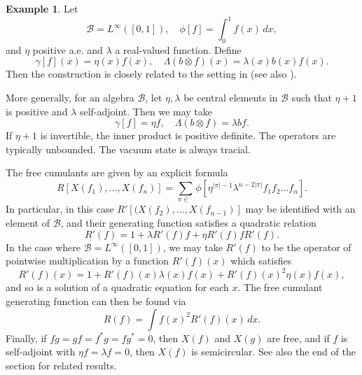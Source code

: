 \documentclass[12pt]{amsart}
\theoremstyle{definition}
\newtheorem{Example}[Thm]{Example}
\newcommand{\abs}[1]{\left\vert#1\right\vert}
\newcommand{\mc}[1]{\mathcal{#1}}
\DeclareMathOperator{\cNC}{\widetilde{\mathrm{NC}}}
\begin{document}
\begin{Example}
\label{Example:Bozejko}
Let
\[
\mc{B} = L^\infty([0,1]), \quad \phi[f] = \int_0^1 f(x) \,dx,
\]
and $\eta$ positive a.e. and $\lambda$ a real-valued function. Define
\[
\gamma[f](x) = \eta(x) f(x), \quad \Lambda(b \otimes f)(x) = \lambda(x) b(x) f(x).
\]
Then the construction is closely related to the setting in \cite{Bozejko-Lytvynov-Meixner-I,Bozejko-Lytvynov-Meixner-II} (see also \cite{Bozejko-Lytvynov-Rodionova-Anyon}).

More generally, for an algebra $\mc{B}$, let $\eta, \lambda$ be central elements in $\mc{B}$ such that $\eta + 1$ is positive and $\lambda$ self-adjoint. Then we may take
\[
\gamma[f] = \eta f, \quad \Lambda(b \otimes f) = \lambda b f.
\]
If $\eta + 1$ is invertible, the inner product is positive definite. The operators are typically unbounded. The vacuum state is always tracial.

The free cumulants are given by an explicit formula
\[
R[X(f_1), \ldots, X(f_n)] = \sum_{\pi \in \cNC} \phi[\eta^{\abs{\pi} - 1} \lambda^{n - 2 \abs{\pi}} f_1 f_2 \ldots f_n].
\]
In particular, in this case $R'[(X(f_2), \ldots, X(f_{n-1})]$ may be identified with an element of $\mc{B}$, and their generating function satisfies a quadratic relation
\begin{equation} \label{Eq:BozekjoRPrime}
R'(f)
= 1 + \lambda R'(f) f + \eta R'(f) f R'(f).
\end{equation}
In the case where $\mc{B} = L^\infty([0,1])$, we may take $R'(f)$ to be the operator of pointwise multiplication by a function $R'(f)(x)$ which satisfies
\[
R'(f)(x)
= 1 + R'(f)(x) \lambda(x) f(x) + R'(f)(x)^2 \eta(x) f(x),
\]
and so is a solution of a quadratic equation for each $x$. The free cumulant generating function can then be found via
\[
R(f) = \int f(x)^2 R'(f)(x) \,dx.
\]
Finally, if $f g = g f = f^\ast g = f g^\ast = 0$, then $X(f)$ and $X(g)$ are free, and if $f$ is self-adjoint with $\eta f = \lambda f = 0$, then $X(f)$ is semicircular. See also the end of the section for related results.
\end{Example}
\end{document}
